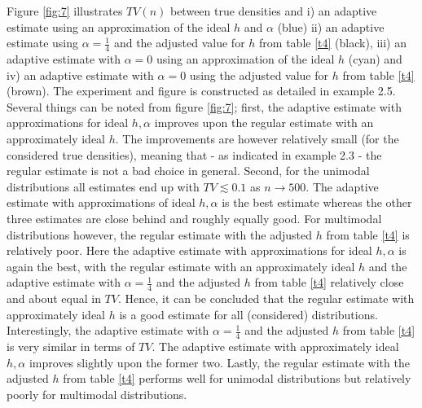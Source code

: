\documentclass[
twoside,
openright,
titlepage,
numbers=noenddot,
headinclude,%
footinclude=true,
dottedtoc, %
ngerman,
american, %
pagesize=pdftex,
]{book}
\begin{document}
	\begin{example}
		Figure \ref{fig:7} illustrates $TV(n)$ between true densities and i) an adaptive estimate using an approximation of the ideal $h$ and $\alpha$ (blue) ii) an adaptive estimate using $\alpha=\frac{1}{4}$ and the adjusted value for $h$ from table \ref{t4} (black), iii) an adaptive estimate with $\alpha=0$ using an approximation of the ideal $h$ (cyan) and iv) an adaptive estimate with $\alpha=0$ using the adjusted value for $h$ from table \ref{t4} (brown). The experiment and figure is constructed as detailed in example 2.5.\newline
		Several things can be noted from figure \ref{fig:7}; first, the adaptive estimate with approximations for ideal $h,\alpha$ improves upon the regular estimate with an approximately ideal $h$. The improvements are however relatively small (for the considered true densities), meaning that - as indicated in example 2.3 - the regular estimate is not a bad choice in general. Second, for the unimodal distributions all estimates end up with $TV\lesssim0.1$ as $n\rightarrow 500$. The adaptive estimate with approximations of ideal $h,\alpha$ is the best estimate whereas the other three estimates are close behind and roughly equally good. For multimodal distributions however, the regular estimate with the adjusted $h$ from table \ref{t4} is relatively poor. Here the adaptive estimate with approximations for ideal $h,\alpha$ is again the best, with the regular estimate with an approximately ideal $h$ and the adaptive estimate with $\alpha=\frac{1}{4}$ and the adjusted $h$ from table \ref{t4} relatively close and about equal in $TV$. Hence, it can be concluded that the regular estimate with approximately ideal $h$ is a good estimate for all (considered) distributions. Interestingly, the adaptive estimate with $\alpha=\frac{1}{4}$ and the adjusted $h$ from table \ref{t4} is very similar in terms of $TV$. The adaptive estimate with approximately ideal $h,\alpha$ improves slightly upon the former two. Lastly, the regular estimate with the adjusted $h$ from table \ref{t4} performs well for unimodal distributions but relatively poorly for multimodal distributions.\newline

\end{example}
\end{document}
